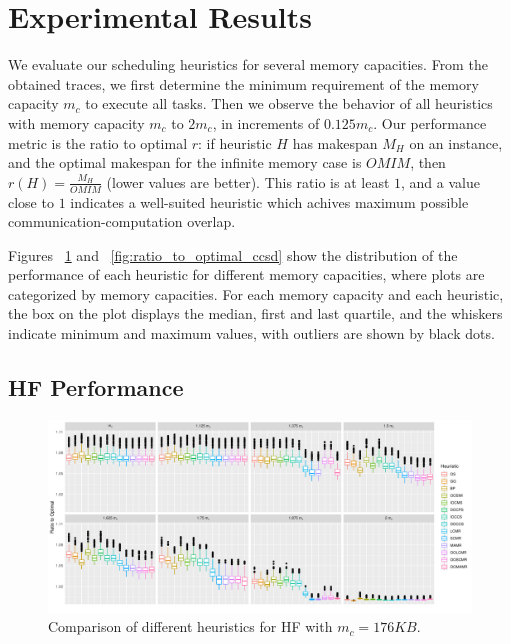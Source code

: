 \documentclass[sigconf]{acmart}
\begin{document}
{		
		\section{Experimental Results}
		\label{sec:expResults}
		We evaluate our scheduling heuristics for several memory capacities. From the obtained traces, we first determine the minimum requirement of the memory capacity $m_c$ to execute all tasks. Then we observe the behavior of all heuristics with memory capacity $m_c$ to $2m_c$, in increments of $0.125m_c$. Our performance metric is the ratio to optimal $r$: if heuristic $H$ has makespan $M_H$ on an instance, and the optimal makespan for the infinite memory case is $OMIM$, then $r(H)=\frac{M_H}{OMIM}$ (lower values are better). This ratio is at least $1$, and a value close to $1$ indicates a well-suited  heuristic which achives maximum possible communication-computation overlap.
		
		Figures ~\ref{fig:ratio_to_optimal_hf} and ~\ref{fig:ratio_to_optimal_ccsd} show the distribution of the performance of each heuristic for different memory capacities, where plots are categorized by memory capacities. For each memory capacity and each heuristic, the box on the plot displays the median, first and last quartile, and the whiskers indicate minimum and maximum values, with outliers are shown by black dots.
		\subsection{HF Performance}	
		\begin{figure}[htb]
			\includegraphics[scale=0.5]{./results/ratio_to_optimal_selected_hf.pdf}
			\caption{Comparison of different heuristics for HF with $m_c=176KB$.}
			\label{fig:ratio_to_optimal_hf}
		\end{figure}
		
}
\end{document}
